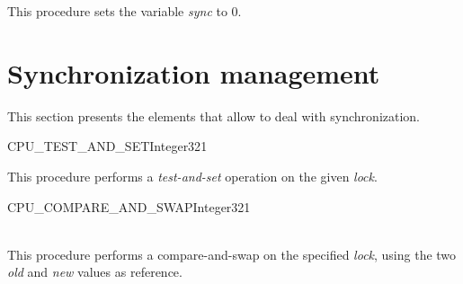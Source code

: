 This procedure sets the variable \emph{sync} to 0.

\skipoff
\section {Synchronization management}
This section presents the elements that allow to deal with synchronization.
\skipon

\begin{function}{CPU\_TEST\_AND\_SET}{Integer32}{1}
\end{function}

This procedure performs a \emph{test-and-set} operation on the given
\emph{lock}.

\begin{function}{CPU\_COMPARE\_AND\_SWAP}{Integer32}{1}
	\\
	\\
\end{function}

This procedure performs a compare-and-swap on the specified \emph{lock}, using
the two \emph{old} and \emph{new} values as reference.
